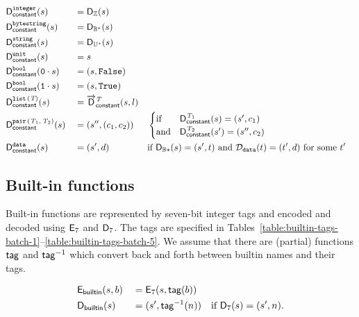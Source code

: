 \begin{alignat*}{3}
  &\mathsf{D}_{\mathsf{constant}}^{\mathtt{integer}}(s)              &&= \mathsf{D}_{\mathbb{Z}}(s) \\
  &\mathsf{D}_{\mathsf{constant}}^{\mathtt{bytestring}}(s)           &&= \mathsf{D}_{\mathbb{B}^*}(s) \\
  &\mathsf{D}_{\mathsf{constant}}^{\mathtt{string}}(s)               &&= \mathsf{D}_{\mathbb{U}^*}(s) \\
  &\mathsf{D}_{\mathsf{constant}}^{\mathtt{unit}}(s)                 &&= s  \\
  &\mathsf{D}_{\mathsf{constant}}^{\mathtt{bool}}(\mathtt{0} \cdot s)  &&= (s, \texttt{False}) \\
  &\mathsf{D}_{\mathsf{constant}}^{\mathtt{bool}}(\mathtt{1} \cdot s)  &&= (s, \texttt{True}) \\
  &\mathsf{D}_{\mathsf{constant}}^{\mathtt{list}\,\mathtt{(}\textit{T}\mathtt{)}}(s)              &&= \overrightarrow{\mathsf{D}}^{\textit{T}}_{\mathsf{constant}}(s, l) \\
  &\mathsf{D}_{\mathsf{constant}}^{\mathtt{pair}\,\mathtt{(}\textit{T}_1\mathtt{,}\,\textit{T}_2\mathtt{)}}(s)     &&= (s'', (c_1, c_2))
  && \begin{cases}
       \text{if}  & \mathsf{D}_{\mathsf{constant}}^{\textit{T}_1}(s) = (s', c_1) \\
       \text{and} & \mathsf{D}_{\mathsf{constant}}^{\textit{T}_2}(s') = (s'', c_2)
     \end{cases}\\
  &\mathsf{D}_{\mathsf{constant}}^{\mathtt{data}}(s)                  &&= (s', d) &&
                                           \text{if $\mathsf{D}_{\mathbb{B}*}(s) = (s', t)$
                                            and $\mathcal{D}_{\mathtt{data}}(t) = (t', d)$ for some $t'$}
\end{alignat*}

\subsection{Built-in functions}
Built-in functions are represented by seven-bit integer tags and encoded and
decoded using $\mathsf{E}_7$ and $\mathsf{D}_7$.  The tags are specified in
Tables~\ref{table:builtin-tags-batch-1}--\ref{table:builtin-tags-batch-5}.  We
assume that there are (partial) functions $\mathsf{tag}$ and $\mathsf{tag}^{-1}$ which convert back
and forth between builtin names and their tags.

\begin{alignat*}{2}
  & \mathsf{E}_{\mathsf{builtin}}(s,b) &&= \mathsf{E}_7(s, \mathsf{tag}(b))\\
  & \mathsf{D}_{\mathsf{builtin}}(s)   &&= (s', \mathsf{tag}^{-1}(n)) \quad \text{if $\mathsf{D}_7(s) = (s', n)$}.\\
\end{alignat*}

